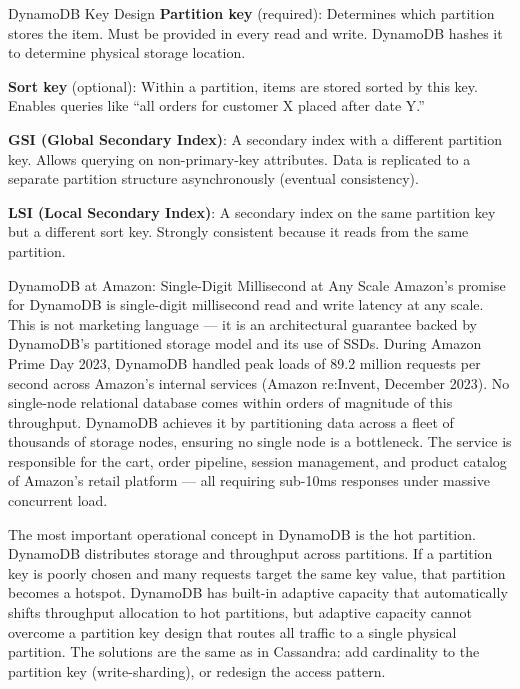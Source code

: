 \documentclass[11pt,a4paper]{article}
\begin{document}
\begin{termbox}{DynamoDB Key Design}
\textbf{Partition key} (required): Determines which partition stores the item. Must be provided in every read and write. DynamoDB hashes it to determine physical storage location.

\textbf{Sort key} (optional): Within a partition, items are stored sorted by this key. Enables queries like ``all orders for customer X placed after date Y.''

\textbf{GSI (Global Secondary Index)}: A secondary index with a different partition key. Allows querying on non-primary-key attributes. Data is replicated to a separate partition structure asynchronously (eventual consistency).

\textbf{LSI (Local Secondary Index)}: A secondary index on the same partition key but a different sort key. Strongly consistent because it reads from the same partition.
\end{termbox}

\begin{industrybox}{DynamoDB at Amazon: Single-Digit Millisecond at Any Scale}
Amazon's promise for DynamoDB is single-digit millisecond read and write latency at any scale. This is not marketing language --- it is an architectural guarantee backed by DynamoDB's partitioned storage model and its use of SSDs. During Amazon Prime Day 2023, DynamoDB handled peak loads of 89.2 million requests per second across Amazon's internal services (Amazon re:Invent, December 2023). No single-node relational database comes within orders of magnitude of this throughput. DynamoDB achieves it by partitioning data across a fleet of thousands of storage nodes, ensuring no single node is a bottleneck. The service is responsible for the cart, order pipeline, session management, and product catalog of Amazon's retail platform --- all requiring sub-10ms responses under massive concurrent load.
\end{industrybox}

The most important operational concept in DynamoDB is the hot partition. DynamoDB distributes storage and throughput across partitions. If a partition key is poorly chosen and many requests target the same key value, that partition becomes a hotspot. DynamoDB has built-in adaptive capacity that automatically shifts throughput allocation to hot partitions, but adaptive capacity cannot overcome a partition key design that routes all traffic to a single physical partition. The solutions are the same as in Cassandra: add cardinality to the partition key (write-sharding), or redesign the access pattern.
\end{document}
